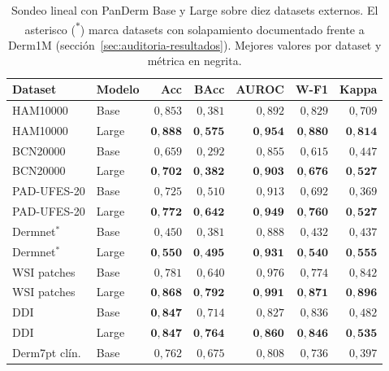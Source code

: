\begin{table}[H]
\centering
\footnotesize
\setlength{\tabcolsep}{4pt}
\renewcommand{\arraystretch}{0.95}
\caption{Sondeo lineal con PanDerm Base y Large sobre diez datasets
externos. El asterisco (\textsuperscript{$\ast$}) marca datasets con
solapamiento documentado frente a Derm1M (secci\'on~\ref{sec:auditoria-resultados}).
Mejores valores por dataset y métrica en negrita.}
\label{tab:lp-panderm}
\begin{tabular}{llrrrrr}
\hline
Dataset       & Modelo & Acc            & BAcc           & AUROC          & W-F1           & Kappa \\
\hline
HAM10000      & Base   & $0{,}853$      & $0{,}381$      & $0{,}892$      & $0{,}829$      & $0{,}709$ \\
HAM10000      & Large  & $\mathbf{0{,}888}$ & $\mathbf{0{,}575}$ & $\mathbf{0{,}954}$ & $\mathbf{0{,}880}$ & $\mathbf{0{,}814}$ \\
BCN20000      & Base   & $0{,}659$      & $0{,}292$      & $0{,}855$      & $0{,}615$      & $0{,}447$ \\
BCN20000      & Large  & $\mathbf{0{,}702}$ & $\mathbf{0{,}382}$ & $\mathbf{0{,}903}$ & $\mathbf{0{,}676}$ & $\mathbf{0{,}527}$ \\
PAD-UFES-20   & Base   & $0{,}725$      & $0{,}510$      & $0{,}913$      & $0{,}692$      & $0{,}369$ \\
PAD-UFES-20   & Large  & $\mathbf{0{,}772}$ & $\mathbf{0{,}642}$ & $\mathbf{0{,}949}$ & $\mathbf{0{,}760}$ & $\mathbf{0{,}527}$ \\
Dermnet$^\ast$& Base   & $0{,}450$      & $0{,}381$      & $0{,}888$      & $0{,}432$      & $0{,}437$ \\
Dermnet$^\ast$& Large  & $\mathbf{0{,}550}$ & $\mathbf{0{,}495}$ & $\mathbf{0{,}931}$ & $\mathbf{0{,}540}$ & $\mathbf{0{,}555}$ \\
WSI patches   & Base   & $0{,}781$      & $0{,}640$      & $0{,}976$      & $0{,}774$      & $0{,}842$ \\
WSI patches   & Large  & $\mathbf{0{,}868}$ & $\mathbf{0{,}792}$ & $\mathbf{0{,}991}$ & $\mathbf{0{,}871}$ & $\mathbf{0{,}896}$ \\
DDI           & Base   & $\mathbf{0{,}847}$ & $0{,}714$      & $0{,}827$      & $0{,}836$      & $0{,}482$ \\
DDI           & Large  & $\mathbf{0{,}847}$ & $\mathbf{0{,}764}$ & $\mathbf{0{,}860}$ & $\mathbf{0{,}846}$ & $\mathbf{0{,}535}$ \\
Derm7pt clín. & Base   & $0{,}762$      & $0{,}675$      & $0{,}808$      & $0{,}736$      & $0{,}397$ \\

\end{tabular}
\end{table}
